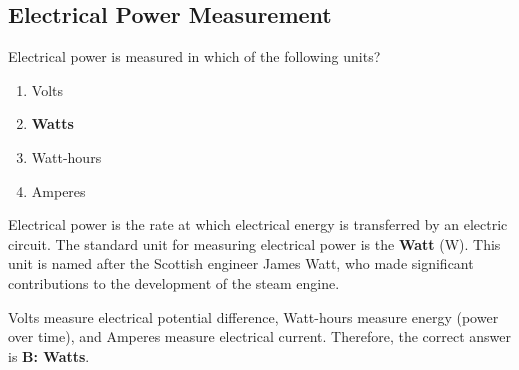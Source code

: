 \subsection{Electrical Power Measurement}
\label{T5A02}

\begin{tcolorbox}[colback=gray!10!white,colframe=black!75!black,title=T5A02]
Electrical power is measured in which of the following units?
\begin{enumerate}[noitemsep]
    \item Volts
    \item \textbf{Watts}
    \item Watt-hours
    \item Amperes
\end{enumerate}
\end{tcolorbox}

Electrical power is the rate at which electrical energy is transferred by an electric circuit. The standard unit for measuring electrical power is the \textbf{Watt} (W). This unit is named after the Scottish engineer James Watt, who made significant contributions to the development of the steam engine. 

Volts measure electrical potential difference, Watt-hours measure energy (power over time), and Amperes measure electrical current. Therefore, the correct answer is \textbf{B: Watts}.